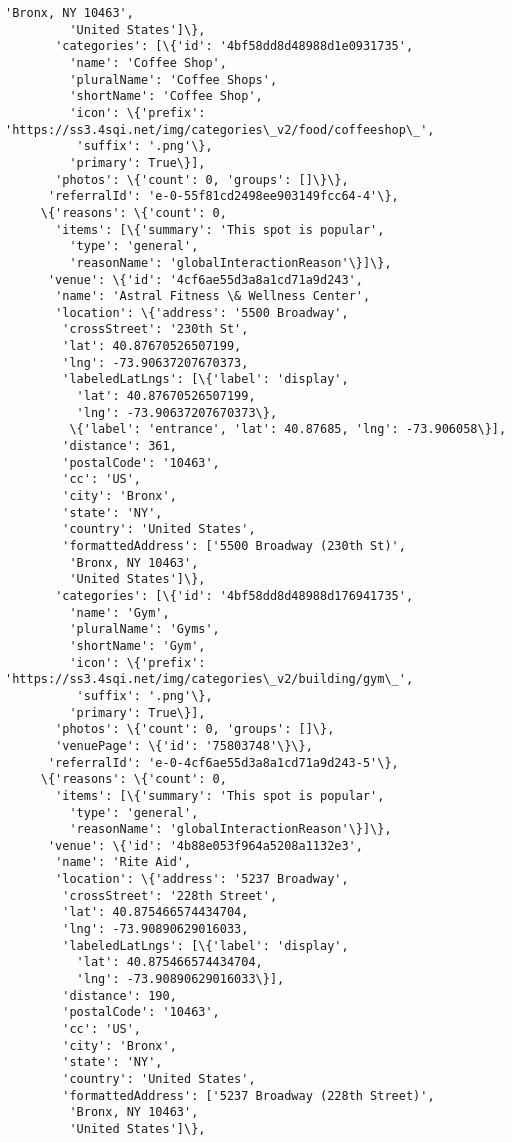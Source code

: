\documentclass[11pt]{article}
\begin{document}
\begin{tcolorbox}[breakable, size=fbox, boxrule=.5pt, pad at break*=1mm, opacityfill=0]
\begin{Verbatim}[commandchars=\\\{\}]
         'Bronx, NY 10463',
         'United States']\},
       'categories': [\{'id': '4bf58dd8d48988d1e0931735',
         'name': 'Coffee Shop',
         'pluralName': 'Coffee Shops',
         'shortName': 'Coffee Shop',
         'icon': \{'prefix':
'https://ss3.4sqi.net/img/categories\_v2/food/coffeeshop\_',
          'suffix': '.png'\},
         'primary': True\}],
       'photos': \{'count': 0, 'groups': []\}\},
      'referralId': 'e-0-55f81cd2498ee903149fcc64-4'\},
     \{'reasons': \{'count': 0,
       'items': [\{'summary': 'This spot is popular',
         'type': 'general',
         'reasonName': 'globalInteractionReason'\}]\},
      'venue': \{'id': '4cf6ae55d3a8a1cd71a9d243',
       'name': 'Astral Fitness \& Wellness Center',
       'location': \{'address': '5500 Broadway',
        'crossStreet': '230th St',
        'lat': 40.87670526507199,
        'lng': -73.90637207670373,
        'labeledLatLngs': [\{'label': 'display',
          'lat': 40.87670526507199,
          'lng': -73.90637207670373\},
         \{'label': 'entrance', 'lat': 40.87685, 'lng': -73.906058\}],
        'distance': 361,
        'postalCode': '10463',
        'cc': 'US',
        'city': 'Bronx',
        'state': 'NY',
        'country': 'United States',
        'formattedAddress': ['5500 Broadway (230th St)',
         'Bronx, NY 10463',
         'United States']\},
       'categories': [\{'id': '4bf58dd8d48988d176941735',
         'name': 'Gym',
         'pluralName': 'Gyms',
         'shortName': 'Gym',
         'icon': \{'prefix':
'https://ss3.4sqi.net/img/categories\_v2/building/gym\_',
          'suffix': '.png'\},
         'primary': True\}],
       'photos': \{'count': 0, 'groups': []\},
       'venuePage': \{'id': '75803748'\}\},
      'referralId': 'e-0-4cf6ae55d3a8a1cd71a9d243-5'\},
     \{'reasons': \{'count': 0,
       'items': [\{'summary': 'This spot is popular',
         'type': 'general',
         'reasonName': 'globalInteractionReason'\}]\},
      'venue': \{'id': '4b88e053f964a5208a1132e3',
       'name': 'Rite Aid',
       'location': \{'address': '5237 Broadway',
        'crossStreet': '228th Street',
        'lat': 40.875466574434704,
        'lng': -73.90890629016033,
        'labeledLatLngs': [\{'label': 'display',
          'lat': 40.875466574434704,
          'lng': -73.90890629016033\}],
        'distance': 190,
        'postalCode': '10463',
        'cc': 'US',
        'city': 'Bronx',
        'state': 'NY',
        'country': 'United States',
        'formattedAddress': ['5237 Broadway (228th Street)',
         'Bronx, NY 10463',
         'United States']\},

\end{Verbatim}
\end{tcolorbox}
\end{document}
